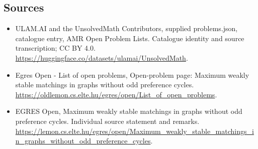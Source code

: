 \documentclass[11pt,a4paper]{article}
\begin{document}
\subsection{Sources}
\begin{itemize}
\item[S1] ULAM.AI and the UnsolvedMath Contributors, supplied problems.json, catalogue entry, AMR Open Problem Lists. Catalogue identity and source transcription; CC BY 4.0.
\url{https://huggingface.co/datasets/ulamai/UnsolvedMath}.
\item[S2] Egres Open - List of open problems, Open-problem page: Maximum weakly stable matchings in graphs without odd preference cycles. 
\url{https://oldlemon.cs.elte.hu/egres/open/List_of_open_problems}.
\item[S3] EGRES Open, Maximum weakly stable matchings in graphs without odd preference cycles. Individual source statement and remarks.
\url{https://lemon.cs.elte.hu/egres/open/Maximum_weakly_stable_matchings_in_graphs_without_odd_preference_cycles}.
\end{itemize}
\end{document}

